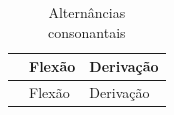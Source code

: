 
\begin{center}
	\begin{longtable}{lll}
		\caption{Alternâncias consonantais}\label{tab:alternapalat}                                                                                                             \\
		\toprule
		                                                  & Flexão                                                   & Derivação                                                \\
		\midrule
		\endfirsthead%

		\toprule
		                                                  & Flexão                                                   & Derivação                                                \\
		\midrule
		\endhead%


\end{longtable}
\end{center}
